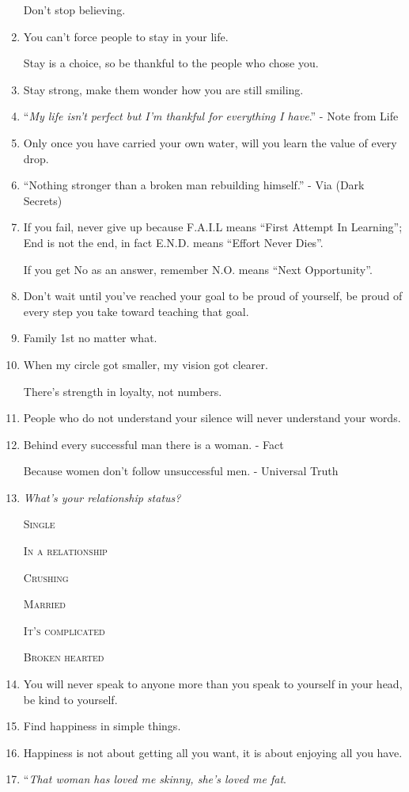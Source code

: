 \documentclass{article}
\begin{document}
\begin{enumerate}
	Don't stop believing.
	\item You can't force people to stay in your life.
	
	Stay is a choice, so be thankful to the people who chose you.
	\item Stay strong, make them wonder how you are still smiling.
	\item ``\textit{My life isn't perfect but I'm thankful for everything I have}.'' - Note from Life
	\item Only once you have carried your own water, will you learn the value of every drop.
	\item ``Nothing stronger than a broken man rebuilding himself.'' - Via (Dark Secrets)
	\item If you fail, never give up because F.A.I.L means ``First Attempt In Learning''; End is not the end, in fact E.N.D. means ``Effort Never Dies''.
	
	If you get No as an answer, remember N.O. means ``Next Opportunity''.
	\item Don't wait until you've reached your goal to be proud of yourself, be proud of every step you take toward teaching that goal.
	\item Family 1st no matter what.
	\item When my circle got smaller, my vision got clearer.
	
	There's strength in loyalty, not numbers.
	\item People who do not understand your silence will never understand your words.
	\item Behind every successful man there is a woman. - Fact
	
	Because women don't follow unsuccessful men. - Universal Truth
	\item \textit{What's your relationship status?}
	
	\textsc{Single}
	
	\textsc{In a relationship}
	
	\textsc{Crushing}
	
	\textsc{Married}
	
	\textsc{It's complicated}
	
	\textsc{Broken hearted}
	\item You will never speak to anyone more than you speak to yourself in your head, be kind to yourself.
	\item Find happiness in simple things.
	\item Happiness is not about getting all you want, it is about enjoying all you have.
	\item ``\textit{That woman has loved me skinny, she's loved me fat}.
	

\end{enumerate}
\end{document}
